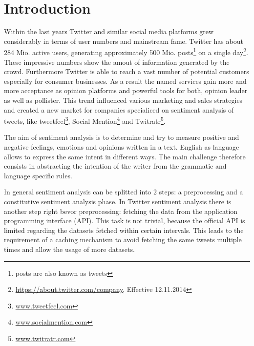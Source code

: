\section{Introduction}


Within the last years Twitter and similar social media platforms grew considerably in terms of user numbers and mainstream fame. Twitter has about 284 Mio. active users, generating approximately 500 Mio. posts\footnote{posts are also known as tweets} on a single day\footnote{\url{https://about.twitter.com/company}, Effective 12.11.2014}. These impressive numbers show the amout of information generated by the crowd. Furthermore Twitter is able to reach a vast number of potential customers especially for consumer businesses. As a result the named services gain more and more acceptance as opinion platforms and powerful tools for both, opinion leader as well as pollister. This trend influenced various marketing and sales strategies and created a new market for companies specialiced on sentiment analysis of tweets, like tweetfeel\footnote{\url{www.tweetfeel.com}}, Social Mention\footnote{\url{www.socialmention.com}} and Twitratr\footnote{\url{www.twitratr.com}}.


The aim of sentiment analysis is to determine and try to measure positive and negative feelings, emotions and opinions written in a text. English as language allows to express the same intent in different ways. The main challenge therefore consists in abstracting the intention of the writer from the grammatic and language specific rules. 

In general sentiment analysis can be splitted into 2 steps: a preprocessing and a constitutive sentiment analysis phase. In Twitter sentiment analysis there is another step right bevor preprocessing: fetching the data from the application programming interface (API). This task is not trivial, because the official API is limited regarding the datasets fetched within certain intervals. This leads to the requirement of a caching mechanism to avoid fetching the same tweets multiple times and allow the usage of more datasets.



